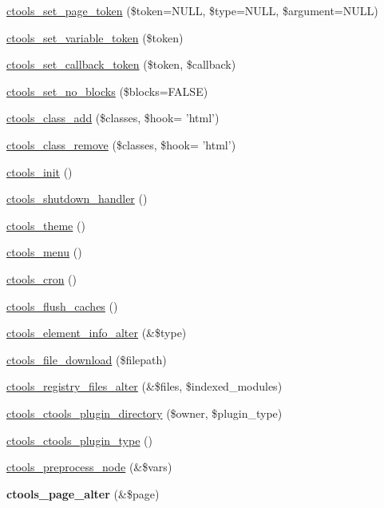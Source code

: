 \begin{DoxyCompactItemize}
\item 
\hyperlink{ctools_8module_a0a8283ac6186ae3c5f1075fd8a05dd64}{ctools\_\-set\_\-page\_\-token} (\$token=NULL, \$type=NULL, \$argument=NULL)
\item 
\hyperlink{ctools_8module_af50c57385ec72ff698a4292ce5b9cecd}{ctools\_\-set\_\-variable\_\-token} (\$token)
\item 
\hyperlink{ctools_8module_a75a083090c8f72d76a9e6378a911bc50}{ctools\_\-set\_\-callback\_\-token} (\$token, \$callback)
\item 
\hyperlink{ctools_8module_a03a4ac4bc4f550a72c5d661f9124c9a6}{ctools\_\-set\_\-no\_\-blocks} (\$blocks=FALSE)
\item 
\hyperlink{ctools_8module_ab5cc2ffd960a4d73767401993abbfaa4}{ctools\_\-class\_\-add} (\$classes, \$hook= 'html')
\item 
\hyperlink{ctools_8module_a3f5486d5ce6afc374f0131aa7a71387a}{ctools\_\-class\_\-remove} (\$classes, \$hook= 'html')
\item 
\hyperlink{ctools_8module_a27c07c71e495f2aacb20b8291dffc65a}{ctools\_\-init} ()
\item 
\hyperlink{ctools_8module_aa5bb2f555630d9f5eb2b695c2e3eb68c}{ctools\_\-shutdown\_\-handler} ()
\item 
\hyperlink{ctools_8module_aec20ea7c40c247f48eddb4073aa2a447}{ctools\_\-theme} ()
\item 
\hyperlink{ctools_8module_a2385dc0b63f4409bfda5056b1954c6d5}{ctools\_\-menu} ()
\item 
\hyperlink{ctools_8module_a6004ee8fa215743c49e011b33edbe843}{ctools\_\-cron} ()
\item 
\hyperlink{ctools_8module_aa00f403972d4b65170a3effe89eec22e}{ctools\_\-flush\_\-caches} ()
\item 
\hyperlink{ctools_8module_a555fb0b73704f629803ed07eff93f97d}{ctools\_\-element\_\-info\_\-alter} (\&\$type)
\item 
\hyperlink{ctools_8module_ae5e454efdea69c33f8faf0d461dce188}{ctools\_\-file\_\-download} (\$filepath)
\item 
\hyperlink{ctools_8module_ae64a38f412c2d9b9892b29551c27f104}{ctools\_\-registry\_\-files\_\-alter} (\&\$files, \$indexed\_\-modules)
\item 
\hyperlink{ctools_8module_a2b2ccbc9a1ae532cdf17e7d1836a40fb}{ctools\_\-ctools\_\-plugin\_\-directory} (\$owner, \$plugin\_\-type)
\item 
\hyperlink{ctools_8module_a76a9ad5ac309f0526af308e38aa3f574}{ctools\_\-ctools\_\-plugin\_\-type} ()
\item 
\hyperlink{ctools_8module_aacda26406250e7a22dbfce3c95e8a364}{ctools\_\-preprocess\_\-node} (\&\$vars)
\item 
\hypertarget{ctools_8module_aad5602367f85ec067b9ea0cdafb4ed5d}{
{\bfseries ctools\_\-page\_\-alter} (\&\$page)}
\label{ctools_8module_aad5602367f85ec067b9ea0cdafb4ed5d}


\end{DoxyCompactItemize}
